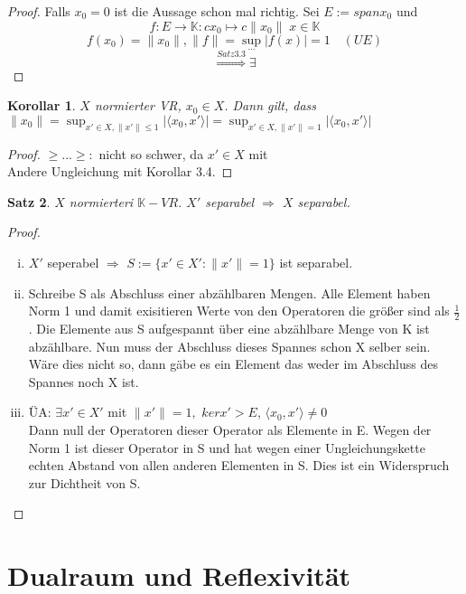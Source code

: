 \documentclass[ngerman]{report}
\theoremstyle{plain}%
\newtheorem{thm}{Satz}[chapter]
\newtheorem{cor}[thm]{Korollar}
\theoremstyle{definition}%
\theoremstyle{myStyle}
\newcommand{\K}{\mathbb{K}}
\newcommand{\norm}[1]{\|#1\|}
\newcommand{\df}[1][]{%
	\overset{#1}{\Rightarrow}
}
\newcommand{\set}[1]{\{#1\}}
\begin{document}
	\begin{proof}
		Falls $x_0 = 0$ ist die Aussage schon mal richtig. Sei $E := span{x_0}$ und 
		$$f: E \to \K : cx_0 \mapsto c\norm{x_0} \; x\in \K$$ 
		$$f(x_0) = \norm{x_0}, \norm{f} = \sup_{...}|f(x)| = 1 \quad (UE)$$
		$$\df[Satz 3.3] \exists$$
	\end{proof}

	\begin{cor}
		$X$ normierter VR, $x_0 \in X$. Dann gilt, dass $\norm{x_0} = \sup_{x' \in X, \norm{x'} \leq 1}|\langle x_0, x' \rangle | = \sup_{x' \in X, \norm{x'} = 1}|\langle x_0, x' \rangle |$
	\end{cor}		

	\begin{proof}
	 $\geq ... \geq :$ nicht so schwer, da $x' \in X$ mit  \\
		Andere Ungleichung mit Korollar 3.4.	
	\end{proof}

	\begin{thm}
	$X$ normierteri $\K-VR$. $X'$ separabel $\df$ $X$ separabel.
	\end{thm}

	\begin{proof}
		\begin{enumerate}[(i)]
			\item $X'$ seperabel $\df$ $S := \set{x' \in X': \norm{x'} = 1}$ ist separabel.
			\item Schreibe S als Abschluss einer abzählbaren Mengen. Alle Element haben Norm 1 und damit exisitieren Werte von den Operatoren die größer sind als $\frac{1}{2}$. Die Elemente aus S aufgespannt über eine abzählbare Menge von K ist abzählbare. Nun muss der Abschluss dieses Spannes schon X selber sein. 
			Wäre dies nicht so, dann gäbe es ein Element das weder im Abschluss des Spannes noch X ist.
			\item ÜA: $\exists x' \in X'$ mit $\norm{x'} = 1,$ $ker x' > E$, $\langle x_0, x' \rangle \neq 0$ \\
			Dann null der Operatoren dieser Operator als Elemente in E. Wegen der Norm 1 ist dieser Operator in S und hat wegen einer Ungleichungskette echten Abstand von allen anderen Elementen in S. Dies ist ein Widerspruch zur Dichtheit von S. 
		\end{enumerate}

	\end{proof}

\section{Dualraum und Reflexivität}
\end{document}
